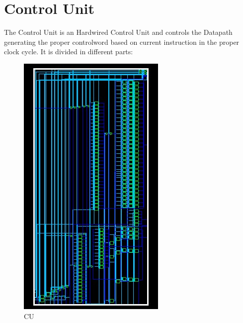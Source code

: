 \chapter{Control Unit}
\label{Control Unit}
The Control Unit is an Hardwired Control Unit and controls the Datapath generating the proper controlword based on current instruction in the proper clock cycle. It is divided in different parts:


\begin{figure}[h!]
    \centering
    \includegraphics[scale = 0.60]
    {chapters/figures/CU_highlevel}
    \caption{CU}
    \end{figure}


